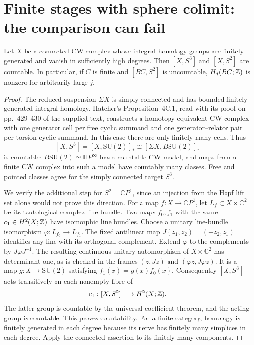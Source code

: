\section{Finite stages with sphere colimit: the comparison can fail}
\label{sec:finitecomparison}

\begin{theorem}
\label{CD:boundedhomology}
Let $X$ be a connected CW complex whose integral homology groups are
finitely generated and vanish in sufficiently high degrees.
Then $[X,S^3]$ and $[X,S^2]$ are countable.
In particular, if $C$ is finite and $[BC,S^2]$ is uncountable,
$H_j(BC;\mathbb Z)$ is nonzero for arbitrarily large $j$.
\end{theorem}
\begin{proof}
The reduced suspension $\Sigma X$ is simply connected and has bounded
finitely generated integral homology.  Hatcher's Proposition~4C.1,
read with its proof on pp.~429--430 of the supplied text, constructs
a homotopy-equivalent CW complex with one generator cell per free
cyclic summand and one generator--relator pair per torsion cyclic
summand.  In this case there are only finitely many cells.  Thus
\[
 [X,S^3]=[X,\mathrm{SU}(2)]_*
       \cong[\Sigma X,B\mathrm{SU}(2)]_*
\]
is countable: $B\mathrm{SU}(2)\simeq\mathbb HP^\infty$ has a countable
CW model, and maps from a finite CW complex into such a model have
countably many classes.  Free and pointed classes agree for the
simply connected target $S^3$.

We verify the additional step for $S^2=\mathbb CP^1$, since an
injection from the Hopf lift set alone would not prove this direction.
For a map $f:X\to\mathbb CP^1$, let $L_f\subset X\times\mathbb C^2$
be its tautological complex line bundle.  Two maps $f_0,f_1$ with
the same $c_1\in H^2(X;\mathbb Z)$ have isomorphic line bundles.
Choose a unitary line-bundle isomorphism
$\varphi:L_{f_0}\to L_{f_1}$.
The fixed antilinear map
$J(z_1,z_2)=(-\overline z_2,\overline z_1)$ identifies any line with
its orthogonal complement.  Extend $\varphi$ to the complements by
$J\varphi J^{-1}$.  The resulting continuous unitary automorphism
of $X\times\mathbb C^2$ has determinant one, as is checked in the
frames $(z,Jz)$ and $(\varphi z,J\varphi z)$.
It is a map $g:X\to\mathrm{SU}(2)$ satisfying $f_1(x)=g(x)f_0(x)$.
Consequently $[X,S^3]$ acts transitively on each nonempty fibre of
\[
                  c_1:[X,S^2]\longrightarrow H^2(X;\mathbb Z).
\]
The latter group is countable by the universal coefficient theorem,
and the acting group is countable.  This proves countability.
For a finite category, homology is finitely generated in each degree
because its nerve has finitely many simplices in each degree.
Apply the connected assertion to its finitely many components.
\end{proof}

